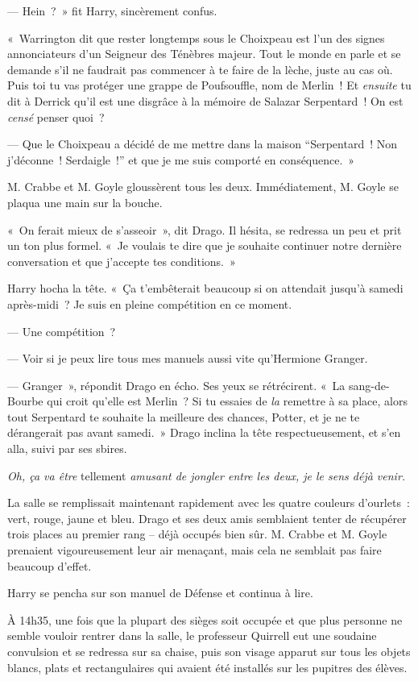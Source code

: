 --- Hein~?~» fit Harry, sincèrement confus.

«~Warrington dit que rester longtemps sous le Choixpeau est l'un des signes annonciateurs d'un Seigneur des Ténèbres majeur.
Tout le monde en parle et se demande s'il ne faudrait pas commencer à te faire de la lèche, juste au cas où.
Puis toi tu vas protéger une grappe de Poufsouffle, nom de Merlin~!
Et \emph{ensuite} tu dit à Derrick qu'il est une disgrâce à la mémoire de Salazar Serpentard~!
On est \emph{censé} penser quoi~?

--- Que le Choixpeau a décidé de me mettre dans la maison “Serpentard~! Non j'déconne~! Serdaigle~!” et que je me suis comporté en conséquence.~»

M. Crabbe et M. Goyle gloussèrent tous les deux. Immédiatement, M. Goyle se plaqua une main sur la bouche.

«~On ferait mieux de s'asseoir~», dit Drago.
Il hésita, se redressa un peu et prit un ton plus formel.
«~Je voulais te dire que je souhaite continuer notre dernière conversation et que j'accepte tes conditions.~»

Harry hocha la tête.
«~Ça t'embêterait beaucoup si on attendait jusqu'à samedi après-midi~?
Je suis en pleine compétition en ce moment.

--- Une compétition~?

--- Voir si je peux lire tous mes manuels aussi vite qu'Hermione Granger.

--- Granger~», répondit Drago en écho.
Ses yeux se rétrécirent.
«~La sang-de-Bourbe qui croit qu'elle est Merlin~?
Si tu essaies de \emph{la} remettre à sa place, alors tout Serpentard te souhaite la meilleure des chances, Potter, et je ne te dérangerait pas avant samedi.~»
Drago inclina la tête respectueusement, et s'en alla, suivi par ses sbires.

\emph{Oh, ça va être} tellement \emph{amusant de jongler entre les deux, je le sens déjà venir.}

La salle se remplissait maintenant rapidement avec les quatre couleurs d'ourlets~: vert, rouge, jaune et bleu.
Drago et ses deux amis semblaient tenter de récupérer trois places au premier rang -- déjà occupés bien sûr.
M. Crabbe et M. Goyle prenaient vigoureusement leur air menaçant, mais cela ne semblait pas faire beaucoup d'effet.

Harry se pencha sur son manuel de Défense et continua à lire.

\later

À 14h35, une fois que la plupart des sièges soit occupée et que plus personne ne semble vouloir rentrer dans la salle, le professeur Quirrell eut une soudaine convulsion et se redressa sur sa chaise, puis son visage apparut sur tous les objets blancs, plats et rectangulaires qui avaient été installés sur les pupitres des élèves.

